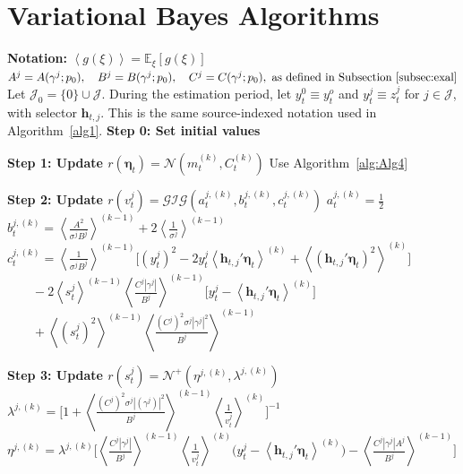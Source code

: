\documentclass[APA,STIX1COL]{WileyNJD-v2}
\begin{document}
 \clearpage


\section{Variational Bayes Algorithms}

\begin{algorithm}
\caption{Variational Bayes (VB) Algorithm}
\label{alg:Alg3}
\begin{algorithmic}

\State \textbf{Notation:}
\State  $\left\langle g(\xi) \right\rangle = \mathbb{E}_\xi\left[ g(\xi) \right]$
\State  \(
A^j = A(\gamma^j;p_0), \quad B^j = B(\gamma^j;p_0), \quad C^j = C(\gamma^j;p_0), \text{ as defined in Subsection~\ref{subsec:exal}}
\)
\State  Let \(\mathcal{J}_0=\{0\}\cup\mathcal{J}\). During the estimation period, let \(y_t^0 \equiv y_t^o\) and \(y_t^j \equiv z_t^j\) for \(j\in\mathcal{J}\), with selector \(\mathbf{h}_{t,j}\). This is the same source-indexed notation used in Algorithm~\ref{alg1}.
\State \textbf{Step 0: Set initial values}

    \State \textbf{Step 1: Update $r(\boldsymbol{\eta}_t)=\mathcal{N}(m^{(k)}_t,C^{(k)}_t)$}
    \State Use Algorithm~\ref{alg:Alg4}

        \State \textbf{Step 2: Update $r(v^j_t)=\mathcal{GIG}(a_t^{j,(k)},b_t^{j,(k)},c_t^{j,(k)})$}
            \State $a_t^{j,(k)} = \frac{1}{2}$
            \State $b_t^{j,(k)} = \left\langle \frac{A^2}{\sigma^j B^j} \right\rangle^{(k-1)} + 2 \left\langle \frac{1}{\sigma^j} \right\rangle^{(k-1)}$
            \State $c_t^{j,(k)} = \left\langle \frac{1}{\sigma^j B^j} \right\rangle^{(k-1)} \Big[ (y_t^j)^2 - 2y_t^j \left\langle  \mathbf{h}_{t,j}' \boldsymbol{\eta}_t \right\rangle^{(k)} + \left\langle (  \mathbf{h}_{t,j}' \boldsymbol{\eta}_t )^2 \right\rangle^{(k)} \Big]$
            \State $\quad \quad -2 \left\langle s^j_t \right\rangle^{(k-1)} \left\langle \frac{C^j|\gamma^j|}{B^j} \right\rangle^{(k-1)} \Big[ y_t^j - \left\langle  \mathbf{h}_{t,j}' \boldsymbol{\eta}_t \right\rangle^{(k)} \Big]$
            \State $\quad \quad + \left\langle (s^j_t)^2 \right\rangle^{(k-1)} \left\langle \frac{(C^j)^2\sigma^j|\gamma^j|^2}{B^j} \right\rangle^{(k-1)}$
        \EndFor

        \State \textbf{Step 3: Update $r(s^j_t)=\mathcal{N}^+(\eta^{j,(k)},\lambda^{j,(k)})$}
            \State $\lambda^{j,(k)} = \Big[ 1+\left\langle \frac{(C^j)^2 \sigma^j |(\gamma^j)|^2}{B^j} \right\rangle^{(k-1)} \left\langle \frac{1}{v^j_t} \right\rangle^{(k)} \Big]^{-1}$
            \State $\eta^{j,(k)} = \lambda^{j,(k)}  \Big[ \left\langle \frac{C^j |\gamma^j|}{B^j} \right\rangle^{(k-1)} \left\langle \frac{1}{v^j_t} \right\rangle^{(k)} \Big( y_t^j - \left\langle  \mathbf{h}_{t,j}' \boldsymbol{\eta}_t \right\rangle^{(k)} \Big) - \left\langle \frac{C^j |\gamma^j| A^j}{B^j} \right\rangle^{(k-1)} \Big]$
        \EndFor


\end{algorithmic}
\end{algorithm}
\end{document}
